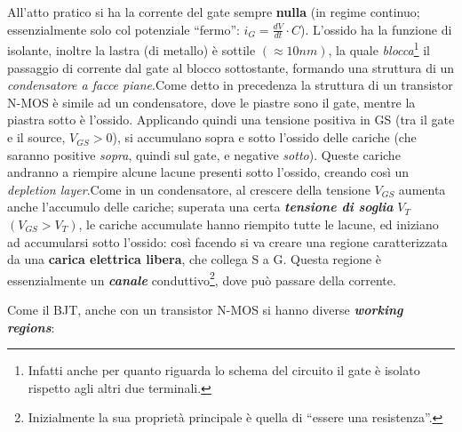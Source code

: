 \documentclass[
]{book}
\begin{document}
All'atto pratico si ha la corrente del gate sempre \textbf{nulla} (in
regime continuo; essenzialmente solo col potenziale ``fermo'':
\(i_{G}=\frac{dV}{dt}\cdot C\)). L'ossido ha la funzione di isolante,
inoltre la lastra (di metallo) è sottile \((\approx 10 nm)\), la quale
\emph{blocca}\footnote{Infatti anche per quanto riguarda lo schema del
  circuito il gate è isolato rispetto agli altri due terminali.} il
passaggio di corrente dal gate al blocco sottostante, formando una
struttura di un \emph{condensatore a facce piane}.\newline Come detto in
precedenza la struttura di un transistor N-MOS è simile ad un
condensatore, dove le piastre sono il gate, mentre la piastra sotto è
l'ossido. Applicando quindi una tensione positiva in GS (tra il gate e
il source, \(V_{GS}>0\)), si accumulano sopra e sotto l'ossido delle
cariche (che saranno positive \emph{sopra}, quindi sul gate, e negative
\emph{sotto}). Queste cariche andranno a riempire alcune lacune presenti
sotto l'ossido, creando così un \emph{depletion layer}.\newline Come in
un condensatore, al crescere della tensione \(V_{GS}\) aumenta anche
l'accumulo delle cariche; superata una certa \textbf{\emph{tensione di
soglia}} \(V_{T}\) \((V_{GS}>V_T)\), le cariche accumulate hanno
riempito tutte le lacune, ed iniziano ad accumularsi sotto l'ossido:
così facendo si va creare una regione caratterizzata da una
\textbf{carica elettrica libera}, che collega S a G. Questa regione è
essenzialmente un \textbf{\emph{canale}} conduttivo\footnote{Inizialmente
  la sua proprietà principale è quella di ``essere una resistenza''.},
dove può passare della corrente.

Come il BJT, anche con un transistor N-MOS si hanno diverse
\textbf{\emph{working regions}}:
\end{document}

